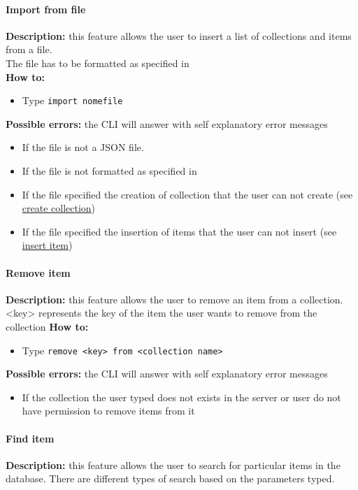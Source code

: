 \documentclass{scalatekids-article}
\begin{document}
\paragraph{Import from file}
\label{sec:import}
\textbf{Description:} this feature allows the user to insert a list of collections and items from a file.\\
The file has to be formatted as specified in \\%
\textbf{How to:} 
\begin{itemize}
	\item Type \texttt{import nomefile}
\end{itemize}
\textbf{Possible errors:} the CLI will answer with self explanatory error messages 
\begin{itemize}
	\item If the file is not a JSON file.
	\item If the file is not formatted as specified in %
	\item If the file specified the creation of collection that the user can not create (see \hyperref[sec:createcollection]{create collection})
	\item If the file specified the insertion of items that the user can not insert (see \hyperref[sec:insertitem]{insert item}) 
\end{itemize}

\paragraph{Remove item}
\label{sec:removeitem}
\textbf{Description:} this feature allows the user to remove an item from a collection.\\
<key> represents the key of the item the user wants to remove from the collection
\textbf{How to:} 
\begin{itemize}
	\item Type \texttt{remove <key> from <collection name>}
\end{itemize}
\textbf{Possible errors:} the CLI will answer with self explanatory error messages 
\begin{itemize}
	\item If the collection the user typed does not exists in the server or user do not have permission to remove items from it
\end{itemize}

\paragraph{Find item}
\label{sec:find}
\textbf{Description:} this feature allows the user to search for particular items in the database. There are different types of search based on the parameters typed.\\
\end{document}
